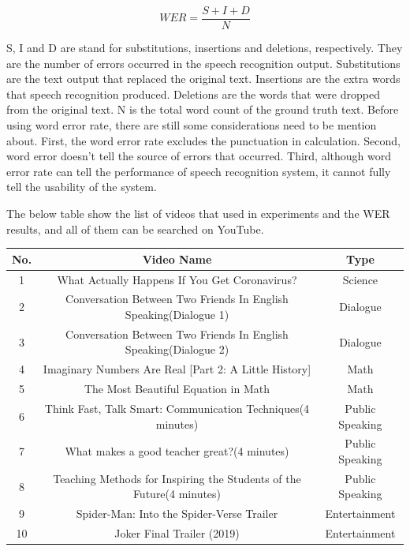 \documentclass[natbib]{muthesis}
\begin{document}
 $$ WER = \frac{S+I+D}{N} $$
 
 S, I and D are stand for substitutions, insertions and deletions, respectively. They are the number of errors occurred in the speech recognition output. Substitutions are the text output that replaced the original text. Insertions are the extra words that speech recognition produced. Deletions are the words that were dropped from the original text. N is the total word count of the ground truth text.
 Before using word error rate, there are still some considerations need to be mention about. First, the word error rate excludes the punctuation in calculation. Second, word error doesn't tell the source of errors that occurred. Third, although word error rate can tell the performance of speech recognition system, it cannot fully tell the usability of the system.
 
 The below table show the list of videos that used in experiments and the WER results, and all of them can be searched on YouTube.
 
 \begin{center}
 	\begin{tabular}{ |c|c|c| } 
 		\hline
 		No. & Video Name & Type \\ 
 		\hline
 		1 & What Actually Happens If You Get Coronavirus? & Science\\
 		2 & Conversation Between Two Friends In English Speaking(Dialogue 1) & Dialogue \\
 		3 & Conversation Between Two Friends In English Speaking(Dialogue 2) & Dialogue \\
 		4 & Imaginary Numbers Are Real [Part 2: A Little History] & Math \\
 		5 & The Most Beautiful Equation in Math & Math \\
 		6 & Think Fast, Talk Smart: Communication Techniques(4 minutes) & Public Speaking \\
 		7 & What makes a good teacher great?(4 minutes) & Public Speaking\\
 		8 & Teaching Methods for Inspiring the Students of the Future(4 minutes) & Public Speaking \\
 		9 & Spider-Man: Into the Spider-Verse Trailer & Entertainment\\
 		10 & Joker Final Trailer (2019) & Entertainment \\
 		\hline
 	\end{tabular}
 \end{center}
 
\end{document}
